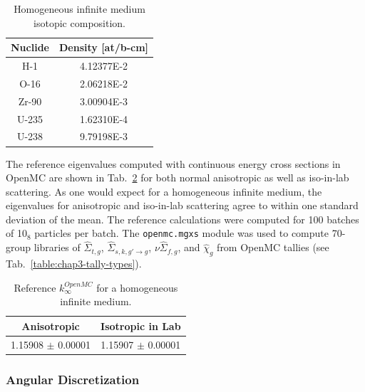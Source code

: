 \begin{table}[h!]
  \centering
  \caption[Infinite medium isotopic composition]{Homogeneous infinite medium isotopic composition.}
  \small
  \label{table:chap5-inf-med-isotopes} 
  \vspace{6pt}
  \begin{tabular}{c c}
  \toprule
  \rowcolor{lightgray}
  {\bf Nuclide} &
  {\bf Density [at/b-cm]} \\
  \midrule
  H-1 &   4.12377E-2 \\
  O-16 &  2.06218E-2 \\
  Zr-90 & 3.00904E-3 \\
  U-235 & 1.62310E-4 \\
  U-238 & 9.79198E-3 \\
  \bottomrule
\end{tabular}
\end{table}

The reference eigenvalues computed with continuous energy cross sections in OpenMC are shown in Tab.~\ref{table:chap5-inf-med-reference} for both normal anisotropic as well as iso-in-lab scattering. As one would expect for a homogeneous infinite medium, the eigenvalues for anisotropic and iso-in-lab scattering agree to within one standard deviation of the mean. The reference calculations were computed for 100 batches of 10$_{8}$ particles per batch. The \texttt{openmc.mgxs} module was used to compute 70-group libraries of $\hat{\Sigma}_{t,g}$, $\hat{\Sigma}_{s,k,g'\rightarrow g}$, $\nu\hat{\Sigma}_{f,g}$, and $\hat{\chi}_{g}$ from OpenMC tallies (see Tab.~\ref{table:chap3-tally-types}).

\begin{table}[h!]
  \centering
  \caption[Reference $k^{OpenMC}_{\infty}$ for an infinite medium]{Reference $k^{OpenMC}_{\infty}$ for a homogeneous infinite medium.}
  \small
  \label{table:chap5-inf-med-reference} 
  \vspace{6pt}
  \begin{tabular}{c c}
  \toprule
  \rowcolor{lightgray}
  {\cellcolor{carolinablue} {\bf Anisotropic}} &
  {\cellcolor{lightgreen} {\bf Isotropic in Lab}} \\
  \midrule
  1.15908 $\pm$ 0.00001 & 1.15907 $\pm$ 0.00001 \\
  \bottomrule
\end{tabular}
\end{table}

\subsubsection{Angular Discretization}
\label{subsubsec:chap5-inf-med-angle}

